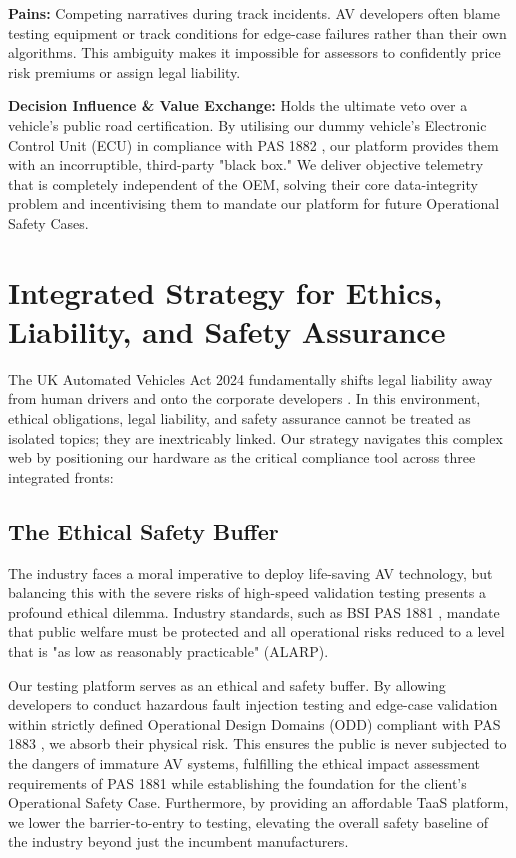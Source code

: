 \textbf{Pains:} Competing narratives during track incidents. AV developers often blame testing equipment or track conditions for edge-case failures rather than their own algorithms. This ambiguity makes it impossible for assessors to confidently price risk premiums or assign legal liability.

\textbf{Decision Influence \& Value Exchange:} Holds the ultimate veto over a vehicle's public road certification. By utilising our dummy vehicle's Electronic Control Unit (ECU) in compliance with PAS 1882 \cite{pas1882}, our platform provides them with an incorruptible, third-party "black box." We deliver objective telemetry that is completely independent of the OEM, solving their core data-integrity problem and incentivising them to mandate our platform for future Operational Safety Cases.

\section{Integrated Strategy for Ethics, Liability, and Safety Assurance}

The UK Automated Vehicles Act 2024 fundamentally shifts legal liability away from human drivers and onto the corporate developers \cite{lawcom_avs_2024}. In this environment, ethical obligations, legal liability, and safety assurance cannot be treated as isolated topics; they are inextricably linked. Our strategy navigates this complex web by positioning our hardware as the critical compliance tool across three integrated fronts:

\subsection{The Ethical Safety Buffer}

The industry faces a moral imperative to deploy life-saving AV technology, but balancing this with the severe risks of high-speed validation testing presents a profound ethical dilemma. Industry standards, such as BSI PAS 1881 \cite{pas1881}, mandate that public welfare must be protected and all operational risks reduced to a level that is "as low as reasonably practicable" (ALARP).

Our testing platform serves as an ethical and safety buffer. By allowing developers to conduct hazardous fault injection testing and edge-case validation within strictly defined Operational Design Domains (ODD) compliant with PAS 1883 \cite{pas1883}, we absorb their physical risk. This ensures the public is never subjected to the dangers of immature AV systems, fulfilling the ethical impact assessment requirements of PAS 1881 \cite{pas1881} while establishing the foundation for the client's Operational Safety Case. Furthermore, by providing an affordable TaaS platform, we lower the barrier-to-entry to testing, elevating the overall safety baseline of the industry beyond just the incumbent manufacturers.

